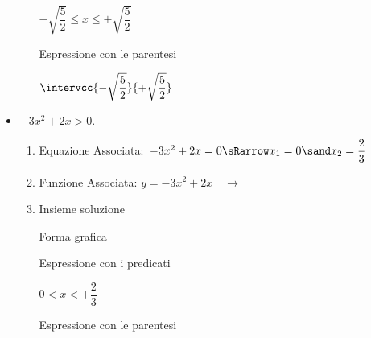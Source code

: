 \begin{esempio}
\begin{itemize}
\begin{enumerate}
\begin{minipage}{.32\textwidth}
 \begin{center}
  \(-\sqrt{\dfrac{5}{2}} \le x \le +\sqrt{\dfrac{5}{2}}\)
  \vspace{1em}
 \end{center}
  \end{minipage}
  \begin{minipage}{.32\textwidth}
  Espressione con le parentesi\\[-.3em]
  
 \begin{center}
  \(\intervcc{-\sqrt{\dfrac{5}{2}}}{+\sqrt{\dfrac{5}{2}}}\)
  \vspace{.8em}
 \end{center}
  \end{minipage}
\end{enumerate}

\item \(-3x^2 + 2x > 0\).

\begin{enumerate}
 \item
  Equazione Associata:~\(-3x^2 + 2x=0 \sRarrow 
                        x_{1}= 0 \sand x_{2}= \dfrac{2}{3}\)
 \item 
  \begin{minipage}{.45\textwidth}
  Funzione Associata: \(y = -3x^2 + 2x \quad \rightarrow\)
  \end{minipage}
  \begin{minipage}{.30\textwidth}
  \end{minipage}
 \item 
 Insieme soluzione\\
 
  \begin{minipage}{.32\textwidth}
  Forma grafica\\[-.7em]
  
 \begin{center}
  \vspace{.4em}
 \end{center}
  \end{minipage}
  \begin{minipage}{.32\textwidth}
  Espressione con i predicati\\[-.3em]
  
 \begin{center}
  \(0 < x < +\dfrac{2}{3}\)
  \vspace{1em}
 \end{center}
  \end{minipage}
  \begin{minipage}{.32\textwidth}
  Espressione con le parentesi\\[-.3em]
  

\end{minipage}
\end{enumerate}
\end{itemize}
\end{esempio}

